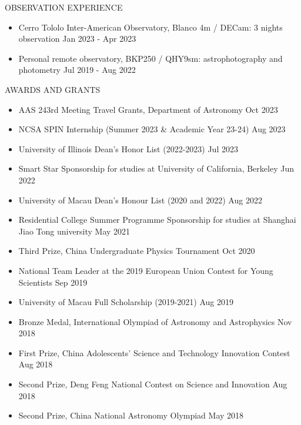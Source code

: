 \documentclass[10pt]{article} %
\begin{document}
\begin{section}{OBSERVATION EXPERIENCE}
    
\begin{itemize}[leftmargin=1.5em]
    \item Cerro Tololo Inter-American Observatory, Blanco 4m / DECam: 3 nights observation \hfill Jan 2023 - Apr 2023
    \item Personal remote observatory, BKP250 / QHY9sm: astrophotography and photometry \hfill Jul 2019 - Aug 2022
\end{itemize}

\end{section}

\begin{section}{AWARDS AND GRANTS}

\begin{itemize}[leftmargin=1.5em]
    \item AAS 243rd Meeting Travel Grants, Department of Astronomy \hfill Oct 2023
    \item NCSA SPIN Internship (Summer 2023 \& Academic Year 23-24) \hfill Aug 2023 
    \item University of Illinois Dean's Honor List (2022-2023) \hfill Jul 2023
    \item Smart Star Sponsorship for studies at University of California, Berkeley \hfill Jun 2022
    \item University of Macau Dean's Honour List (2020 and 2022) \hfill Aug 2022
    \item Residential College Summer Programme Sponsorship for studies at Shanghai Jiao Tong university \hfill May 2021
    \item Third Prize, China Undergraduate Physics Tournament \hfill Oct 2020
    \item National Team Leader at the 2019 European Union Contest for Young Scientists \hfill Sep 2019
    \item University of Macau Full Scholarship (2019-2021) \hfill Aug 2019
    \item Bronze Medal, International Olympiad of Astronomy and Astrophysics \hfill Nov 2018
    \item First Prize, China Adolescents' Science and Technology Innovation Contest \hfill Aug 2018
    \item Second Prize, Deng Feng National Contest on Science and Innovation \hfill Aug 2018
    \item Second Prize, China National Astronomy Olympiad \hfill May 2018
\end{itemize}
    
\end{section}
\end{document}
